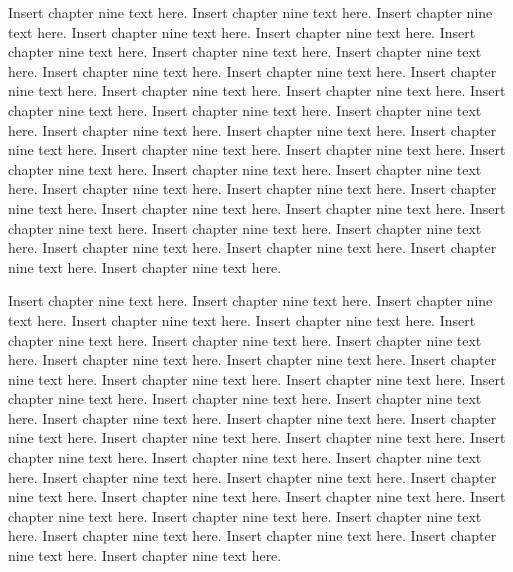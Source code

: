 Insert chapter nine text here. Insert chapter nine text here. Insert chapter nine text here. Insert chapter nine text here. Insert chapter nine text here. Insert chapter nine text here. Insert chapter nine text here. Insert chapter nine text here. Insert chapter nine text here. Insert chapter nine text here. Insert chapter nine text here. Insert chapter nine text here. Insert chapter nine text here. Insert chapter nine text here. Insert chapter nine text here. Insert chapter nine text here. Insert chapter nine text here. Insert chapter nine text here. Insert chapter nine text here. Insert chapter nine text here. Insert chapter nine text here. Insert chapter nine text here. Insert chapter nine text here. Insert chapter nine text here. Insert chapter nine text here. Insert chapter nine text here. Insert chapter nine text here. Insert chapter nine text here. Insert chapter nine text here. Insert chapter nine text here. Insert chapter nine text here. Insert chapter nine text here. Insert chapter nine text here. Insert chapter nine text here. Insert chapter nine text here. Insert chapter nine text here.

Insert chapter nine text here. Insert chapter nine text here. Insert chapter nine text here. Insert chapter nine text here. Insert chapter nine text here. Insert chapter nine text here. Insert chapter nine text here. Insert chapter nine text here. Insert chapter nine text here. Insert chapter nine text here. Insert chapter nine text here. Insert chapter nine text here. Insert chapter nine text here. Insert chapter nine text here. Insert chapter nine text here. Insert chapter nine text here. Insert chapter nine text here. Insert chapter nine text here. Insert chapter nine text here. Insert chapter nine text here. Insert chapter nine text here. Insert chapter nine text here. Insert chapter nine text here. Insert chapter nine text here. Insert chapter nine text here. Insert chapter nine text here. Insert chapter nine text here. Insert chapter nine text here. Insert chapter nine text here. Insert chapter nine text here. Insert chapter nine text here. Insert chapter nine text here. Insert chapter nine text here. Insert chapter nine text here. Insert chapter nine text here. Insert chapter nine text here.

